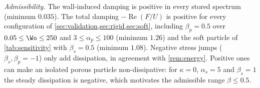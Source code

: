 \emph{Admissibility.} The wall-induced damping is positive in every stored spectrum (minimum $0.035$). The total
damping $-\operatorname{Re}(F/U)$ is positive for every configuration of \cref{sec:validation,sec:rigid,sec:soft},
including $\beta_p=0.5$ over $0.05\le\Wo\le250$ and $3\le\alpha_p\le100$ (minimum $1.26$) and the soft particle of
\cref{tab:sensitivity} with $\beta_s=0.5$ (minimum $1.08$). Negative stress jumps ($\beta_s,\beta_p=-1$) only add
dissipation, in agreement with \cref{rem:energy}. Positive ones can make an isolated porous particle non-dissipative:
for $\kappa=0$, $\alpha_s=5$ and $\beta_s=1$ the steady dissipation is negative, which motivates the admissible range
$\beta\le0.5$.
